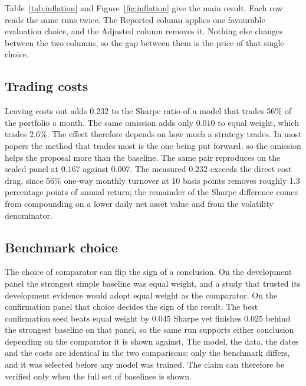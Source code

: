 \documentclass[sigconf,nonacm]{acmart}
\begin{document}
Table~\ref{tab:inflation} and Figure~\ref{fig:inflation} give the main result.
Each row reads the same runs twice. The Reported column applies one favourable
evaluation choice, and the Adjusted column removes it. Nothing else changes
between the two columns, so the gap between them is the price of that single
choice.

\subsection{Trading costs}
Leaving costs out adds $0.232$ to the
Sharpe ratio of a model that trades 56\% of the portfolio a month. The same
omission adds only $0.010$ to equal weight, which trades 2.6\%. The effect
therefore depends on how much a strategy trades. In most papers the method that
trades most is the one being put forward, so the omission helps the proposal
more than the baseline. The same pair reproduces on the sealed panel at $0.167$ against $0.007$. The
measured $0.232$ exceeds the direct cost drag, since 56\% one-way monthly
turnover at 10 basis points removes roughly 1.3 percentage points of annual
return; the remainder of the Sharpe difference comes from compounding on a
lower daily net asset value and from the volatility denominator.

\subsection{Benchmark choice}
The choice of comparator can flip the sign of a
conclusion. On the development panel the strongest simple baseline was equal weight, and a
study that trusted its development evidence would adopt equal weight as the
comparator. On the confirmation panel that choice decides the sign of the
result. The best confirmation seed beats equal weight by $0.045$ Sharpe yet
finishes $0.025$ behind the strongest baseline on that panel, so the same run
supports either conclusion depending on the comparator it is shown against.
The model, the data, the dates and the costs are identical in the two
comparisons; only the benchmark differs, and it was selected before any model
was trained. The claim can therefore be verified only when the full set of
baselines is shown.
\end{document}
